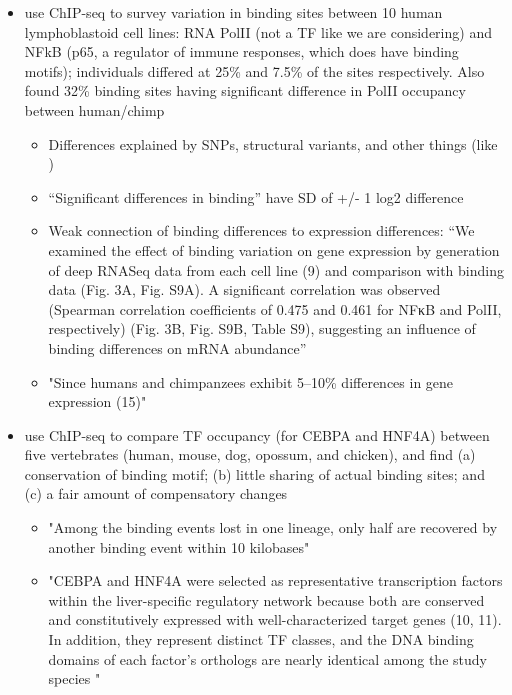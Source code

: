 \documentclass[9 pt]{article}
\begin{document}
\begin{itemize}

    \item \citet{kasowski2010variation} use ChIP-seq to survey variation in binding sites between 10 human lymphoblastoid cell lines:
        RNA PolII (not a TF like we are considering) and NFkB (p65, a regulator of immune responses, which does have binding motifs);
        individuals differed at 25\% and 7.5\% of the sites respectively. 
        Also found 32\% binding sites having significant difference in PolII occupancy between human/chimp
        \begin{itemize}
            \item Differences explained by SNPs, structural variants, and other things (like \citet{shi2016evaluating})
            \item ``Significant differences in binding'' have SD of +/- 1 log2 difference 
            \item Weak connection of binding differences to expression differences:
                ``We examined the effect of binding variation on gene expression by generation of deep RNASeq
                data from each cell line (9) and comparison with binding data (Fig. 3A, Fig. S9A). A
                significant correlation was observed (Spearman correlation coefficients of 0.475 and 0.461 for
                NFκB and PolII, respectively) (Fig. 3B, Fig. S9B, Table S9), suggesting an influence of binding
                differences on mRNA abundance''
            \item "Since humans and chimpanzees exhibit 5–10\% differences in gene expression (15)"
        \end{itemize}

    \item \citet{schmidt2010vertebrate} use ChIP-seq to compare TF occupancy (for CEBPA and HNF4A) between five vertebrates (human, mouse, dog, opossum, and chicken), 
        and find (a) conservation of binding motif; (b) little sharing of actual binding sites; and (c) a fair amount of compensatory changes
        \begin{itemize}

            \item "Among the binding events lost in one lineage, only half are recovered by another binding event within 10 kilobases"

            \item "CEBPA and HNF4A were selected as representative transcription factors within the liver-specific regulatory
                network because both are conserved and constitutively expressed with well-characterized target genes (10, 11). In addition,
                they represent distinct TF classes, and the DNA binding domains of each factor's orthologs are nearly identical among the study species "


\end{itemize}
\end{itemize}
\end{document}
